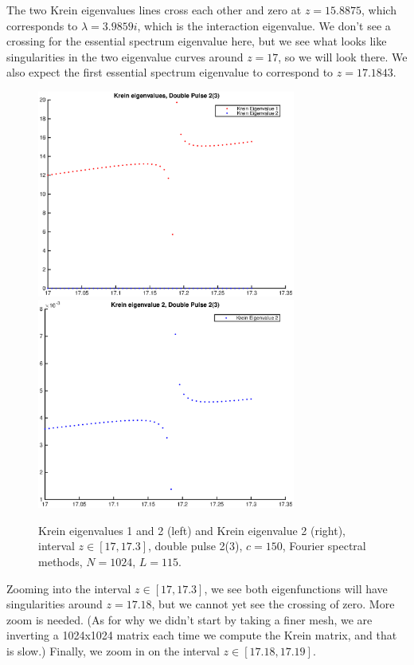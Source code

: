 \documentclass[12pt]{article}
\begin{document}
The two Krein eigenvalues lines cross each other and zero at $z = 15.8875$, which corresponds to $\lambda = 3.9859i$, which is the interaction eigenvalue. We don't see a crossing for the essential spectrum eigenvalue here, but we see what looks like singularities in the two eigenvalue curves around $z = 17$, so we will look there. We also expect the first essential spectrum eigenvalue to correspond to $z = 17.1843$.

\begin{figure}[H]
	\includegraphics[width=8.5cm]{1500F_dp2_115_kreinzoom1.eps}
	\includegraphics[width=8.5cm]{1500F_dp2_115_kreinzoom2}
	\caption{Krein eigenvalues 1 and 2 (left) and Krein eigenvalue 2 (right), interval $z \in [17, 17.3]$, double pulse 2(3), $c = 150$, Fourier spectral methods, $N = 1024$, $L = 115$. }
\end{figure}

Zooming into the interval $z \in [17, 17.3]$, we see both eigenfunctions will have singularities around $z = 17.18$, but we cannot yet see the crossing of zero. More zoom is needed. (As for why we didn't start by taking a finer mesh, we are inverting a 1024x1024 matrix each time we compute the Krein matrix, and that is slow.) Finally, we zoom in on the interval $z \in [17.18, 17.19]$.
\end{document}
